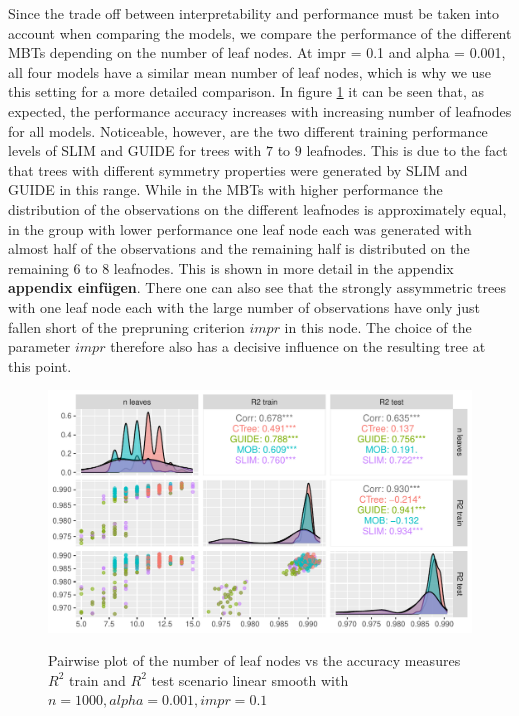 Since the trade off between interpretability and performance must be taken into account when comparing the models, we compare the performance of the different MBTs depending on the number of leaf nodes. 
At impr = 0.1 and alpha = 0.001, all four models have a similar mean number of leaf nodes, which is why we use this setting for a more detailed comparison.
In figure \ref{fig:ls_1000_standalone_r2_nleaves} it can be seen that, as expected, the performance accuracy increases with increasing number of leafnodes for all models. Noticeable, however, are the two different training performance levels of SLIM and GUIDE for trees with $7$ to $9$ leafnodes. This is due to the fact that trees with different symmetry properties were generated by SLIM and GUIDE in this range. While in the MBTs with higher performance the distribution of the observations on the different leafnodes is approximately equal, in the group with lower performance one leaf node each was generated with almost half of the observations and the remaining half is distributed on the remaining $6$ to $8$ leafnodes. This is shown in more detail in the appendix \textbf{appendix einfügen}. There one can also see that the strongly assymmetric trees with one leaf node each with the large number of observations have only just fallen short of the prepruning criterion $impr$ in this node. The choice of the parameter $impr$ therefore also has a decisive influence on the resulting tree at this point.


\begin{figure} 
\caption{Pairwise plot of the number of leaf nodes vs the accuracy measures $R^2$ train and $R^2$ test scenario linear smooth with $n=1000, alpha = 0.001, impr = 0.1$}
    \includegraphics[width=16cm]{Figures/simulations/batchtools/basic_scenarios/linear_smooth/ls_1000_standalone_r2_nleaves.pdf}
    \label{fig:ls_1000_standalone_r2_nleaves}
\end{figure} 



